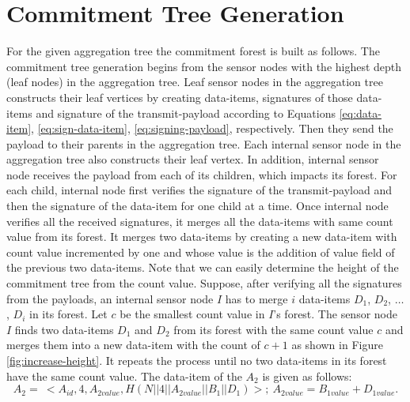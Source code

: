 \section{Commitment Tree Generation}
	For the given aggregation tree the commitment forest is built as follows.
	The commitment tree generation begins from the sensor nodes with the highest depth (leaf nodes) in the aggregation tree.
	Leaf sensor nodes in the aggregation tree constructs their leaf vertices by creating data-items, signatures of those data-items and signature of the transmit-payload according to Equations \ref{eq:data-item}, \ref{eq:sign-data-item}, \ref{eq:signing-payload}, respectively.
	Then they send the payload to their parents in the aggregation tree.	
	Each internal sensor node in the aggregation tree also constructs their leaf vertex.
	In addition, internal sensor node receives the payload from each of its children, which impacts its forest.
	For each child, internal node first verifies the signature of the transmit-payload and then the signature of the data-item for one child at a time.
	Once internal node verifies all the received signatures, it merges all the data-items with same count value from its forest.
	It merges two data-items by creating a new data-item with count value incremented by one and whose value is the addition of value field of the previous two data-items. 
	Note that we can easily determine the height of the commitment tree from the count value.
	Suppose, after verifying all the signatures from the payloads, an internal sensor node $I$ has to merge $i$ data-items $D_{1}$, $D_{2}$, $\dotsc$, $D_{i}$ in its forest.
	Let $c$ be the smallest count value in $I$'s forest.
	The sensor node $I$ finds two data-items $D_{1}$ and $D_{2}$ from its forest with the same count value $c$ and merges them into a new data-item with the count of $c+1$ as shown in Figure \ref{fig:increase-height}.
	It repeats the process until no two data-items in its forest have the same count value.	
	The data-item of the $A_{2}$ is given as follows:
	\begin{equation*}
		A_{2} =\ <A_{id}, 4, A_{2value},H(N||4||A_{2value}||B_{1}||D_{1})>;\ A_{2value} = B_{1value} + D_{1value}. 
	\end{equation*}
	

